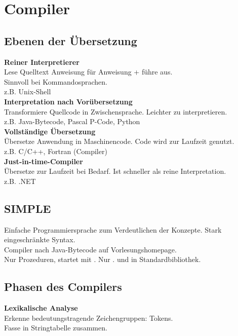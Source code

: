

\section{Compiler}%
\label{cmp:sec:compiler}

\subsection{Ebenen der Übersetzung}%
\label{cmp:sub:ebenen}
\textbf{Reiner Interpretierer}\\
Lese Quelltext Anweisung für Anweisung + führe aus.\\
Sinnvoll bei Kommandosprachen.\\
z.B. Unix-Shell\\

\textbf{Interpretation nach Vorübersetzung}\\
Transformiere Quellcode in Zwischensprache. Leichter zu interpretieren.\\
z.B. Java-Bytecode, Pascal P-Code, Python\\

\textbf{Vollständige Übersetzung}\\
Übersetze Anwendung in Maschinencode. Code wird zur Laufzeit genutzt.\\
z.B. C/C++, Fortran (Compiler)\\

\textbf{Just-in-time-Compiler}\\
Übersetze zur Laufzeit bei Bedarf. Ist schneller als reine Interpretation.\\
z.B. .NET

\subsection{SIMPLE}%
\label{cmp:sub:SIMPLE}
Einfache Programmiersprache zum Verdeutlichen der Konzepte.
Stark eingeschränkte Syntax.\\
Compiler nach Java-Bytecode auf Vorlesungshomepage.\\

Nur Prozeduren, startet mit . Nur .
 und  in Standardbibliothek.

\subsection{Phasen des Compilers}%
\label{cmp:sub:phasen}
\textbf{Lexikalische Analyse}\\
Erkenne bedeutungstragende Zeichengruppen: Tokens.\\
Fasse in Stringtabelle zusammen.\\

